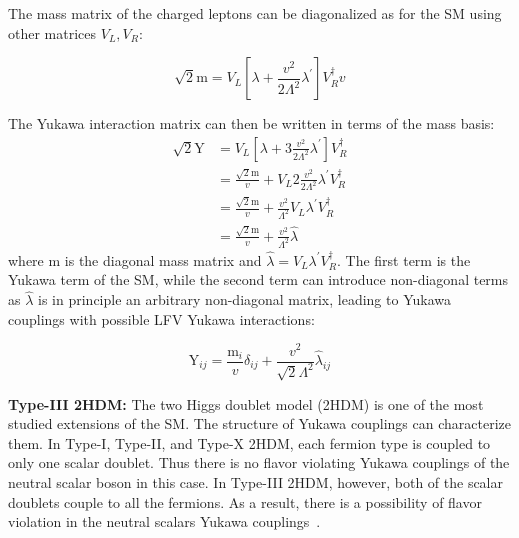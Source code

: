 The mass matrix of the charged leptons can be diagonalized as for the SM using other matrices $V_{L}, V_{R}$:

\begin{equation}
  \sqrt{2} \text{m} = V_{L}[\lambda+\frac{v^2}{2 \Lambda^2} \lambda^{\prime}] V_{R}^{\dagger} v
\end{equation}

The Yukawa interaction matrix can then be written in terms of the mass basis:
%
\begin{equation}
  \begin{aligned}
    \sqrt{2} \text{Y} &=V_{L}[\lambda+3 \frac{v^2}{2 \Lambda^2} \lambda^{\prime}] V_{R}^{\dagger} \\
    &=\frac{\sqrt{2} \text{m}}{v}+V_{L} 2 \frac{v^2}{2 \Lambda^2} \lambda^{\prime} V_{R}^{\dagger} \\
    &=\frac{\sqrt{2} \text{m}}{v}+\frac{v^2}{\Lambda^2} V_{L} \lambda^{\prime} V_{R}^{\dagger} \\
    &=\frac{\sqrt{2} \text{m}}{v}+\frac{v^2}{\Lambda^2} \hat{\lambda}
  \end{aligned}
\end{equation}
%
where $\text{m}$ is the diagonal mass matrix and $\hat{\lambda}=V_{L} \lambda^{\prime} V_{R}^{\dagger}$. The first term is the Yukawa term of the SM, while the second term can introduce non-diagonal terms as $\hat{\lambda}$ is in principle an arbitrary non-diagonal matrix, leading to Yukawa couplings \Yij with possible LFV Yukawa interactions:

\begin{equation}
  \text{Y}_{i j}=\frac{\text{m}_{i}}{v} \delta_{i j}+\frac{v^2}{\sqrt{2} \Lambda^2} \hat{\lambda}_{i j}
\end{equation}

\textbf{Type-III 2HDM:} The two Higgs doublet model (2HDM) is one of the most studied extensions of the SM. The structure of Yukawa couplings can characterize them. In Type-I, Type-II, and Type-X 2HDM, each fermion type is coupled to only one scalar doublet. Thus there is no flavor violating Yukawa couplings of the neutral scalar boson in this case. In Type-III 2HDM, however, both of the scalar doublets couple to all the fermions. As a result, there is a possibility of flavor violation in the neutral scalars Yukawa couplings~\cite{Primulando:2016eod}.

